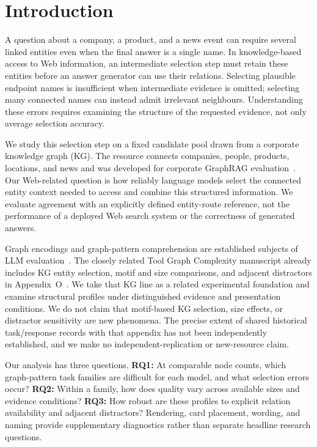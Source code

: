 \section{Introduction}
\label{sec:intro}
A question about a company, a product, and a news event can require several linked entities even when the final answer is a single name. In knowledge-based access to Web information, an intermediate selection step must retain these entities before an answer generator can use their relations. Selecting plausible endpoint names is insufficient when intermediate evidence is omitted; selecting many connected names can instead admit irrelevant neighbours. Understanding these errors requires examining the structure of the requested evidence, not only average selection accuracy.

We study this selection step on a fixed candidate pool drawn from a corporate knowledge graph (KG). The resource connects companies, people, products, locations, and news and was developed for corporate GraphRAG evaluation~\cite{kirpichev2026towards}. Our Web-related question is how reliably language models select the connected entity context needed to access and combine this structured information. We evaluate agreement with an explicitly defined entity-route reference, not the performance of a deployed Web search system or the correctness of generated answers.

Graph encodings and graph-pattern comprehension are established subjects of LLM evaluation~\cite{fatemi2024talklikegraph,dai2025graphpatterns}. The closely related Tool Graph Complexity manuscript already includes KG entity selection, motif and size comparisons, and adjacent distractors in Appendix~O~\cite{anonymousToolGraph}. We take that KG line as a related experimental foundation and examine structural profiles under distinguished evidence and presentation conditions. We do not claim that motif-based KG selection, size effects, or distractor sensitivity are new phenomena. The precise extent of shared historical task/response records with that appendix has not been independently established, and we make no independent-replication or new-resource claim.

Our analysis has three questions. \textbf{RQ1:} At comparable node counts, which graph-pattern task families are difficult for each model, and what selection errors occur? \textbf{RQ2:} Within a family, how does quality vary across available sizes and evidence conditions? \textbf{RQ3:} How robust are these profiles to explicit relation availability and adjacent distractors? Rendering, card placement, wording, and naming provide supplementary diagnostics rather than separate headline research questions.


